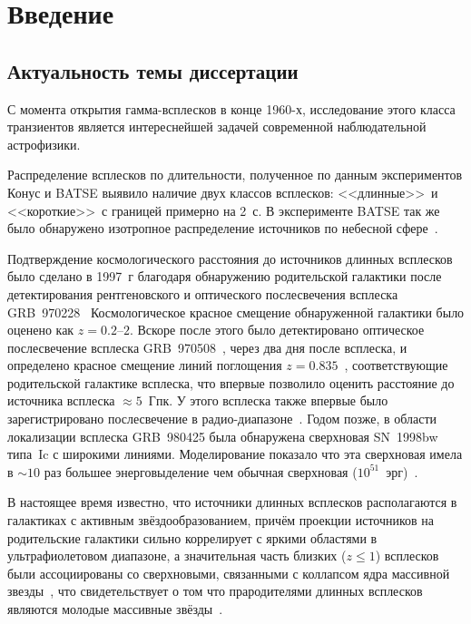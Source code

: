 \chapter{Введение}					
	
\section{Актуальность темы диссертации}
С момента открытия гамма-всплесков в конце 1960-х, исследование этого класса транзиентов
является интереснейшей задачей современной наблюдательной астрофизики.

Распределение всплесков по длительности, полученное по данным экспериментов 
Конус и BATSE выявило наличие двух классов всплесков: <<длинные>>\ и <<короткие>>\ 
с границей примерно на 2~с. В эксперименте BATSE так же было обнаружено изотропное 
распределение источников по небесной сфере~\citep{Mazets_1981_part_1,Briggs_1993ApJ}.  

Подтверждение космологического расстояния до источников длинных всплесков 
было сделано в 1997~г благодаря обнаружению родительской галактики после детектирования 
рентгеновского и оптического послесвечения всплеска GRB~970228~\citep{Costa1997Natur, van_Paradijs_1997Natur} 
Космологическое красное смещение обнаруженной галактики было оценено как $z=0.2\textrm{--}2$.
Вскоре после этого было детектировано оптическое послесвечение всплеска 
GRB~970508~\citep{Djorgovski1997Natur}, через два дня после всплеска, и определено красное смещение линий 
поглощения $z=0.835$~\citep{Metzger_1997Natur, Reichart_1998ApJ}, соответствующие родительской галактике 
всплеска, что впервые позволило оценить расстояние до источника всплеска $\approx 5$~Гпк. 
У этого всплеска также впервые было зарегистрировано послесвечение в радио-диапазоне~\citep{Frail_1997Natur}.
Годом позже, в области локализации всплеска GRB~980425 была обнаружена сверхновая 
SN~1998bw типа~Ic с широкими линиями. Моделирование показало что эта сверхновая 
имела в $\sim 10$ раз большее энерговыделение чем обычная 
сверхновая ($10^{51}$~эрг)~\citep{Hjorth_and_Bloom_2012in_book}.

В настоящее время известно, что источники длинных всплесков располагаются в галактиках 
с активным звёздообразованием, причём проекции источников на родительские галактики сильно
коррелирует с яркими областями в ультрафиолетовом диапазоне, а значительная часть 
близких ($z \le 1$) всплесков были ассоциированы со сверхновыми, связанными с 
коллапсом ядра массивной звезды~\citep{Hjorth_and_Bloom_2012in_book},
что свидетельствует о том что прародителями длинных всплесков являются молодые 
массивные звёзды~\citep[см. обзор][]{Berger_2014ARAA}.

